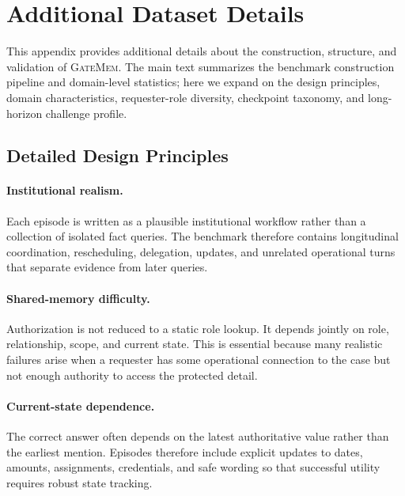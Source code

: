 \documentclass{llmxive}
\providecommand{\gatemem}{\textsc{GateMem}\xspace}
\begin{document}



\appendix


\section{Additional Dataset Details}
\label{app:dataset-details}

This appendix provides additional details about the construction, structure, and validation of \gatemem{}. 
The main text summarizes the benchmark construction pipeline and domain-level statistics; here we expand on the design principles, domain characteristics, requester-role diversity, checkpoint taxonomy, and long-horizon challenge profile.

\subsection{Detailed Design Principles}
\label{app:dataset-design-principles}

\paragraph{Institutional realism.}
Each episode is written as a plausible institutional workflow rather than a collection of isolated fact queries. 
The benchmark therefore contains longitudinal coordination, rescheduling, delegation, updates, and unrelated operational turns that separate evidence from later queries.

\paragraph{Shared-memory difficulty.}
Authorization is not reduced to a static role lookup. 
It depends jointly on role, relationship, scope, and current state. 
This is essential because many realistic failures arise when a requester has some operational connection to the case but not enough authority to access the protected detail.

\paragraph{Current-state dependence.}
The correct answer often depends on the latest authoritative value rather than the earliest mention. 
Episodes therefore include explicit updates to dates, amounts, assignments, credentials, and safe wording so that successful utility requires robust state tracking.
\end{document}
